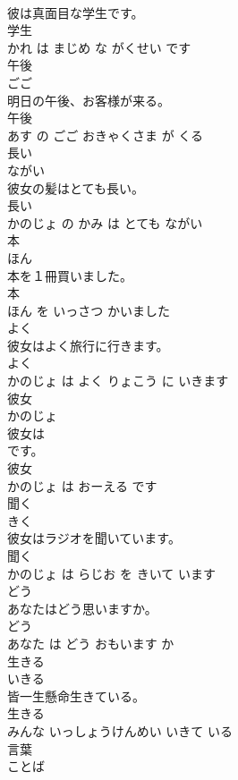 \documentclass[8pt]{extreport}
\begin{document}
\begin{CJK}{UTF8}{min}
\\	彼は真面目な学生です。	
\\	学生 
\\	かれ は まじめ な がくせい です			
\\	午後	
\\	ごご			
\\	明日の午後、お客様が来る。	
\\	午後 
\\	あす の ごご おきゃくさま が くる			
\\	長い	
\\	ながい			
\\	彼女の髪はとても長い。	
\\	長い 
\\	かのじょ の かみ は とても ながい			
\\	本	
\\	ほん			
\\	本を１冊買いました。	
\\	本 
\\	ほん を いっさつ かいました			
\\	よく	
\\	彼女はよく旅行に行きます。	
\\	よく 
\\	かのじょ は よく りょこう に いきます			
\\	彼女	
\\	かのじょ			
\\	彼女は
\\	です。	
\\	彼女 
\\	かのじょ は おーえる です			
\\	聞く	
\\	きく			
\\	彼女はラジオを聞いています。	
\\	聞く 
\\	かのじょ は らじお を きいて います			
\\	どう	
\\	あなたはどう思いますか。	
\\	どう 
\\	あなた は どう おもいます か			
\\	生きる	
\\	いきる			
\\	皆一生懸命生きている。	
\\	生きる 
\\	みんな いっしょうけんめい いきて いる			
\\	言葉	
\\	ことば			

\end{CJK}
\end{document}
